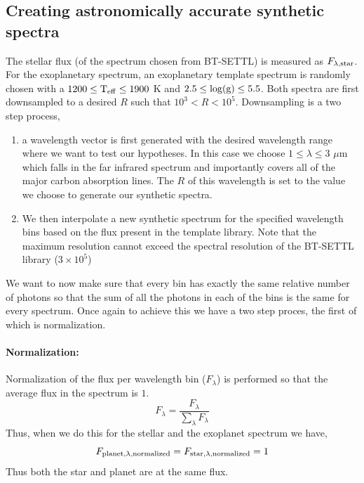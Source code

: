 \subsection{Creating astronomically accurate synthetic spectra}
The stellar flux (of the spectrum chosen from BT-SETTL) is measured as $F_{\rm{\lambda,star}}$.
For the exoplanetary spectrum, an exoplanetary template spectrum is randomly chosen with a $1200 \le \rm{T_{eff}} \le 1900$ K and  $2.5 \le \rm{\log(g)}\le  5.5$. 
Both spectra are first downsampled to a desired $R$ such that $10^3<R<10^5$.
Downsampling is a two step process,
\begin{enumerate}
    \item a wavelength vector is first generated with the desired wavelength range where we want to test our hypotheses. 
    In this case we choose $1\le \lambda\le 3$ $\mu$m which falls in the far infrared spectrum and importantly covers all of the major carbon absorption lines. 
    The $R$ of this wavelength is set to the value we choose to generate our synthetic spectra.
    \item We then interpolate a new synthetic spectrum for the specified wavelength bins based on the flux present in the template library.
    Note that the maximum resolution cannot exceed the spectral resolution of the \textsc{BT-SETTL} library ($3\times10^{5}$)
\end{enumerate}
We want to now make sure that every bin has exactly the same relative number of photons so that the sum of all the photons in each of the bins is the same for every spectrum.
Once again to achieve this we have a two step proces, the first of which is normalization.
\paragraph{Normalization:}
Normalization of the flux per wavelength bin ($F_\lambda$) is performed so that the average flux in the spectrum is $1$.
\begin{equation}
    F_\lambda = \dfrac{F_\lambda}{\sum\limits_{\lambda} F_{\lambda}}
\end{equation}
Thus, when we do this for the stellar and the exoplanet spectrum we have,
\begin{equation}
     F_{\rm{planet,\lambda,normalized}} =  F_{\rm{star},\lambda,normalized} = 1
\end{equation}
Thus both the star and planet are at the same flux. 
